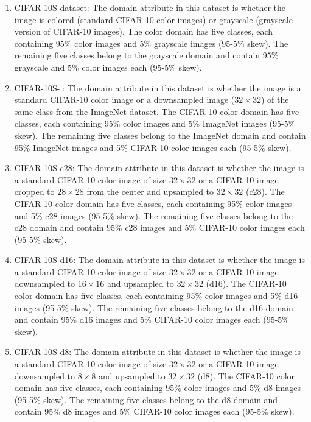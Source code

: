 \documentclass[10pt,twocolumn,letterpaper]{article}
\begin{document}
\begin{enumerate}
    \item CIFAR-10S dataset: The domain attribute in this dataset is whether the image is colored (standard CIFAR-10 color images) or grayscale (grayscale version of CIFAR-10 images). The color domain has five classes, each containing 95\% color images and 5\% grayscale images (95-5\% skew). The remaining five classes belong to the grayscale domain and contain 95\% grayscale and 5\% color images each (95-5\% skew). 
    \item CIFAR-10S-i:  The domain attribute in this dataset is whether the image is a standard CIFAR-10 color image or a downsampled image ($32\times32$) of the same class from the ImageNet dataset. The CIFAR-10 color domain has five classes, each containing 95\% color images and 5\% ImageNet images (95-5\% skew). The remaining five classes belong to the ImageNet domain and contain 95\% ImageNet images and 5\% CIFAR-10 color images each (95-5\% skew).
    \item CIFAR-10S-c28: The domain attribute in this dataset is whether the image is a standard CIFAR-10 color image of size $32\times32$ or a CIFAR-10 image cropped to $28\times28$ from the center and upsampled to $32\times32$ (c28). The CIFAR-10 color domain has five classes, each containing 95\% color images and 5\% c28 images (95-5\% skew). The remaining five classes belong to the c28 domain and contain 95\% c28 images and 5\% CIFAR-10 color images each (95-5\% skew).
    
   
    
    \item CIFAR-10S-d16: The domain attribute in this dataset is whether the image is a standard CIFAR-10 color image of size $32\times32$ or a CIFAR-10 image downsampled to $16\times16$ and upsampled to $32\times32$ (d16). The CIFAR-10 color domain has five classes, each containing 95\% color images and 5\% d16 images (95-5\% skew). The remaining five classes belong to the d16 domain and contain 95\% d16 images and 5\% CIFAR-10 color images each (95-5\% skew).
    
 
    
    \item CIFAR-10S-d8: The domain attribute in this dataset is whether the image is a standard CIFAR-10 color image of size $32\times32$ or a CIFAR-10 image downsampled to $8\times8$ and upsampled to $32\times32$ (d8). The CIFAR-10 color domain has five classes, each containing 95\% color images and 5\% d8 images (95-5\% skew). The remaining five classes belong to the d8 domain and contain 95\% d8 images and 5\% CIFAR-10 color images each (95-5\% skew).
   
\end{enumerate}
\end{document}
